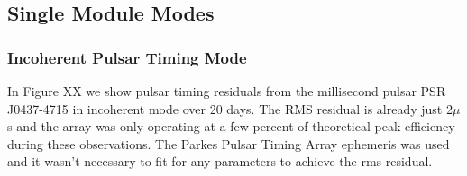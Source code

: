 \subsection{Single Module Modes}
\subsubsection{Incoherent Pulsar Timing Mode}

In Figure XX we show pulsar timing residuals from the millisecond pulsar PSR J0437-4715 in incoherent mode over 20 days. The RMS residual is already just 2$\mu$s and the array was only operating at a few percent of theoretical peak efficiency during these observations. The Parkes Pulsar Timing Array ephemeris was used and it wasn't necessary to fit for any parameters to achieve the rms residual.


